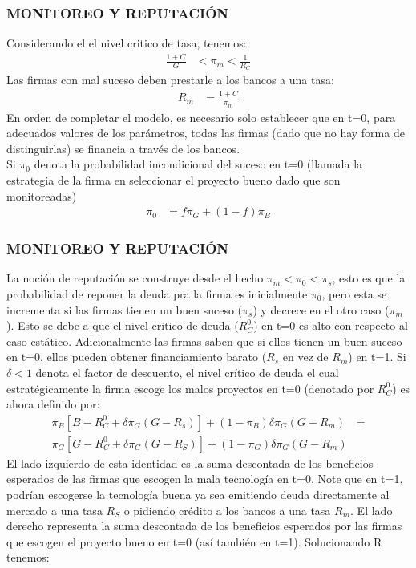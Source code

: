 \documentclass[10pt, xcolor=table, x11names]{beamer}
\begin{document}
\begin{frame}
    \frametitle{{\normalsize MONITOREO Y REPUTACIÓN} {}}
Considerando el el nivel critico de tasa, tenemos:
  \begin{align}
  \frac{1+C}{G}&<\pi_{m}<\frac{1}{R_{C}}
  \end{align} 
Las firmas con mal suceso deben prestarle a los bancos a una tasa:
 \begin{align}
 R_{m}&=\frac{1+C}{\pi_{m}}
 \end{align}   
En orden de completar el modelo, es necesario solo establecer que en t=0, para adecuados valores de los parámetros, todas las firmas (dado que no hay forma de distinguirlas) se financia a través de los bancos.\\
Si $\pi_{0}$ denota la probabilidad incondicional del suceso en t=0 (llamada la estrategia de la firma en seleccionar el proyecto bueno dado que son monitoreadas)
\begin{align}
\pi_{0}&=f\pi_{G}+(1-f)\pi_{B}
\end{align}   

\end{frame}

\begin{frame}
    \frametitle{{\normalsize MONITOREO Y REPUTACIÓN} {}}
    La noción de reputación se construye desde el hecho $\pi_{m}<\pi_{0}<\pi_{s} $, esto es que la probabilidad de reponer la deuda pra la firma es inicialmente $\pi_{0}$, pero esta se incrementa si las firmas tienen un buen suceso ($\pi_{s}$) y decrece en el otro caso ($\pi_{m}$). Esto se debe a que el nivel critico de deuda ($R_{C}^{0} $) en t=0 es alto con respecto al caso estático. Adicionalmente las firmas saben que si ellos tienen un buen suceso en t=0, ellos pueden obtener financiamiento barato ($R_{s} $ en vez de  $ R_{m}$) en t=1. Si $\delta<1$ denota el factor de descuento, el nivel crítico de deuda el cual estratégicamente la firma escoge  los malos proyectos en t=0 (denotado por $R_{C}^{0}$) es ahora definido por:
  \begin{align}
  \pi_{B}\left[B-R_{C}^{0}+\delta\pi_{G}(G-R_{s}) \right]+(1-\pi_{B})\delta \pi_{G}(G-R_{m})&= \nonumber \\
  \pi_{G}\left[G-R_{C}^{0}+\delta\pi_{G}(G-R_{S}) \right]+(1-\pi_{G})\delta \pi_{G}(G-R_{m}) 
  \end{align}  
  El lado izquierdo de esta identidad es la suma descontada de los beneficios esperados de las firmas que escogen la mala tecnología en t=0. Note que en t=1, podrían escogerse la tecnología buena ya sea emitiendo deuda directamente al mercado a una tasa $R_{S} $ o pidiendo crédito a los bancos a una tasa $R_{m} $. El lado derecho representa la suma descontada de los beneficios esperados por las firmas que escogen el proyecto bueno en t=0 (así también en t=1). Solucionando R tenemos:
   
\end{frame}
\end{document}
